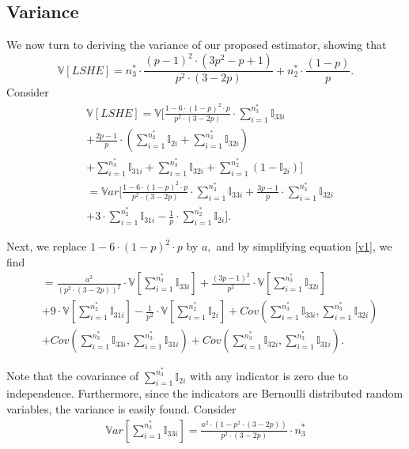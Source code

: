 \documentclass{imsart}
\begin{document}
\subsection{Variance}
We now turn to deriving the variance of our proposed estimator, showing that
$$\mathbb{V}[LSHE] = n_3^* \cdot \frac{(p-1)^2 \cdot (3p^2-p+1)}{p^2 \cdot (3-2p)} + n_2^* \cdot \frac{(1-p)}{p}.$$
Consider
\begin{equation}
\label{v1}
\begin{split}
&\mathbb{V}[LSHE]=
\mathbb{V}[\frac{1-6 \cdot (1-p)^2 \cdot p}{p^2 \cdot (3-2p) } \cdot \sum_{i=1}^{n_3^*}{\mathbb{I}_{33i}}\\
&+
\frac{2p-1}{p} \cdot
(\sum_{i=1}^{n_2^*}{\mathbb{I}_{2i}}
+
\sum_{i=1}^{n_3^*}{\mathbb{I}_{32i}})\\
&+
\sum_{i=1}^{n_3^*}{\mathbb{I}_{31i}}
+
\sum_{i=1}^{n_3^*}{\mathbb{I}_{32i}}
+
\sum_{i=1}^{n_2^*}{(1-\mathbb{I}_{2i})}]\\
&=
\mathbb{V}ar[\frac{1-6 \cdot (1-p)^2 \cdot p}{p^2 \cdot (3-2p) } \cdot \sum_{i=1}^{n_3^*}{\mathbb{I}_{33i}}
+
\frac{3p-1}{p} \cdot
\sum_{i=1}^{n_3^*}{\mathbb{I}_{32i}}\\
&+
3 \cdot
\sum_{i=1}^{n_2^*}{\mathbb{I}_{31i}}
-
\frac{1}{p} \cdot
\sum_{i=1}^{n_2^*}{\mathbb{I}_{2i}}].
\end{split}
\end{equation}

Next, we replace $1-6 \cdot (1-p)^2 \cdot p$ by $a,$ and by simplifying equation \ref{v1},
we find
\begin{equation}
\begin{split}
&=
\frac{a^2}{(p^2 \cdot (3-2p))^2 } \cdot \mathbb{V}[\sum_{i=1}^{n_3^*}{\mathbb{I}_{33i}}]
 +
\frac{(3p-1)^2}{p^2} \cdot
\mathbb{V}[\sum_{i=1}^{n_3^*}{\mathbb{I}_{32i}}]\\
&+
9 \cdot
\mathbb{V}[\sum_{i=1}^{n_2^*}{\mathbb{I}_{31i}}]
-
\frac{1}{p^2} \cdot
\mathbb{V}[\sum_{i=1}^{n_2^*}{\mathbb{I}_{2i}}]
+
Cov(\sum_{i=1}^{n_3^*}{\mathbb{I}_{33i}}, \sum_{i=1}^{n_3^*}{\mathbb{I}_{32i}})\\
&+
Cov(\sum_{i=1}^{n_3^*}{\mathbb{I}_{33i}}, \sum_{i=1}^{n_3^*}{\mathbb{I}_{31i}})
+
Cov(\sum_{i=1}^{n_3^*}{\mathbb{I}_{32i}}, \sum_{i=1}^{n_3^*}{\mathbb{I}_{31i}}).
\end{split}
\end{equation}

Note that the covariance of $\sum_{i=1}^{n_3^*}{\mathbb{I}_{2i}}$ with any indicator is zero due to independence.
Furthermore, since the indicators are Bernoulli distributed random variables, the variance is easily found. Consider
\begin{equation}
\label{v4}
\begin{split}
\mathbb{V}ar[\sum_{i=1}^{n_3^*}{\mathbb{I}_{33i}}]
=  \frac{a^2 \cdot (1-p^2 \cdot (3-2p))}{p^2 \cdot (3-2p) } \cdot n_3^*
\end{split}
\end{equation}
\end{document}
